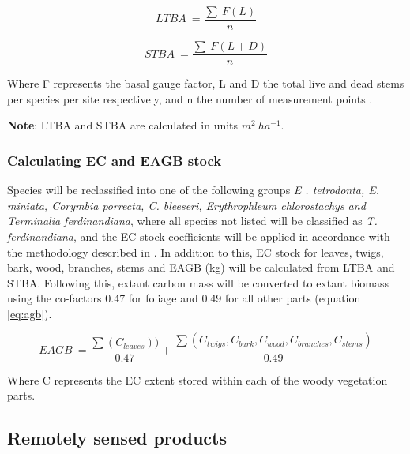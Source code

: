 \begin{equation} \label{eq:ltba}
    LTBA\ = \frac{\sum \ F(L)}{n}
\end{equation}

\begin{equation} \label{eq:stba}
    STBA\ = \frac{\sum \ F(L + D)}{n}
\end{equation}

Where F represents the basal gauge factor, L and D the total live and dead stems per species per site respectively, and n the number of measurement points \citep{muiretal2011}.

\textbf{Note}: LTBA and STBA are calculated in units $m^2 \ ha^{-1}$.

\subsubsection{Calculating EC and EAGB stock}
Species will be reclassified into one of the following groups \emph{E . tetrodonta, E. miniata, Corymbia porrecta, C. bleeseri, Erythrophleum chlorostachys and Terminalia ferdinandiana}, where all species not listed will be classified as \emph{T. ferdinandiana}, and the EC stock coefficients will be applied in accordance with the methodology described in \cite{cooketal2005}. In addition to this, EC stock for leaves, twigs, bark, wood, branches, stems and EAGB (kg) will be calculated \citep{cooketal2005} from LTBA and STBA. Following this, extant carbon mass will be converted to extant biomass using the co-factors 0.47 for foliage and 0.49 for all other parts \citep{cooketal2005, gifford2000} (equation \ref{eq:agb}).

\begin{equation}\label{eq:agb}
    EAGB\ = \frac{\sum{(C_{leaves}))}}{0.47} + \frac{\sum{(C_{twigs}, C_{bark}, C_{wood}, C_{branches}, C_{stems})}}{0.49}
\end{equation}

Where C represents the EC extent stored within each of the woody vegetation parts.


\subsection{Remotely sensed products}
